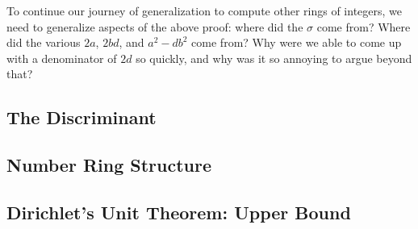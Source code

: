 \documentclass[../notes.tex]{subfiles}
\begin{document}
To continue our journey of generalization to compute other rings of integers, we need to generalize aspects of the above proof: where did the $\sigma$ come from? Where did the various $2a$, $2bd$, and $a^2-db^2$ come from? Why were we able to come up with a denominator of $2d$ so quickly, and why was it so annoying to argue beyond that?

\subsection{The Discriminant}


\subsection{Number Ring Structure}

\subsection{Dirichlet's Unit Theorem: Upper Bound}
\end{document}
